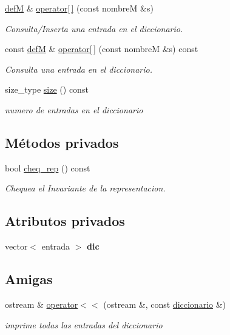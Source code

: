 \begin{DoxyCompactItemize}
\hyperlink{classdefM}{def\-M} \& \hyperlink{classdiccionario_a8b2ac04f691e925d86967bbd62670a4d}{operator\mbox{[}$\,$\mbox{]}} (const nombre\-M \&s)
\begin{DoxyCompactList}\small\item\em \-Consulta/\-Inserta una entrada en el diccionario. \end{DoxyCompactList}\item 
const \hyperlink{classdefM}{def\-M} \& \hyperlink{classdiccionario_a1dbf7b521d4ac17e0bcd5d3e5ecff93d}{operator\mbox{[}$\,$\mbox{]}} (const nombre\-M \&s) const 
\begin{DoxyCompactList}\small\item\em \-Consulta una entrada en el diccionario. \end{DoxyCompactList}\item 
size\-\_\-type \hyperlink{classdiccionario_a441fdeeb87c717757f5f7ff50612d57e}{size} () const 
\begin{DoxyCompactList}\small\item\em numero de entradas en el diccionario \end{DoxyCompactList}\end{DoxyCompactItemize}
\subsection*{\-Métodos privados}
\begin{DoxyCompactItemize}
\item 
bool \hyperlink{classdiccionario_a0af2e538b04d23e6b42e63060c1cf002}{cheq\-\_\-rep} () const 
\begin{DoxyCompactList}\small\item\em \-Chequea el \-Invariante de la representacion. \end{DoxyCompactList}\end{DoxyCompactItemize}
\subsection*{\-Atributos privados}
\begin{DoxyCompactItemize}
\item 
\hypertarget{classdiccionario_ac076e11d1d19be05e28d8a83b2ade886}{vector$<$ entrada $>$ {\bfseries dic}}\label{classdiccionario_ac076e11d1d19be05e28d8a83b2ade886}

\end{DoxyCompactItemize}
\subsection*{\-Amigas}
\begin{DoxyCompactItemize}
\item 
ostream \& \hyperlink{classdiccionario_a516e0071b7e529b4d37892ffb12247ef}{operator$<$$<$} (ostream \&, const \hyperlink{classdiccionario}{diccionario} \&)
\begin{DoxyCompactList}\small\item\em imprime todas las entradas del diccionario \end{DoxyCompactList}\end{DoxyCompactItemize}


